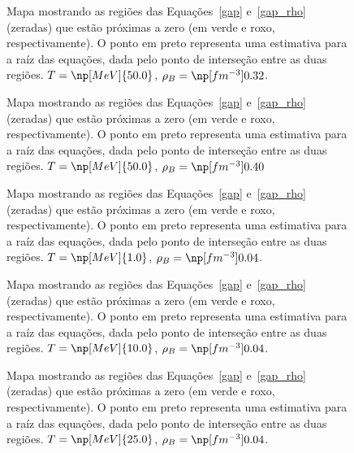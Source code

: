 \begin{figure}
	
	\caption{Mapa mostrando as regiões das Equações~\ref{gap} e~\ref{gap_rho} (zeradas) que estão próximas a zero (em verde e roxo, respectivamente). O ponto em preto representa uma estimativa para a raíz das equações, dada pelo ponto de interseção entre as duas regiões. $T = \np[MeV]{50.0}$, $\rho_B = \np[fm^{-3}]{0.32}$.\protect}
	\label{Fig:Map_9_7}
\end{figure}

\begin{figure}
	
	\caption{Mapa mostrando as regiões das Equações~\ref{gap} e~\ref{gap_rho} (zeradas) que estão próximas a zero (em verde e roxo, respectivamente). O ponto em preto representa uma estimativa para a raíz das equações, dada pelo ponto de interseção entre as duas regiões. $T = \np[MeV]{50.0}$, $\rho_B = \np[fm^{-3}]{0.40}$\protect}
	\label{Fig:Map_9_8}
\end{figure}

\FloatBarrier

\begin{figure}
	
	\caption{Mapa mostrando as regiões das Equações~\ref{gap} e~\ref{gap_rho} (zeradas) que estão próximas a zero (em verde e roxo, respectivamente). O ponto em preto representa uma estimativa para a raíz das equações, dada pelo ponto de interseção entre as duas regiões. $T = \np[MeV]{1.0}$, $\rho_B = \np[fm^{-3}]{0.04}$.\protect}
	\label{Fig:Map_0_0}
\end{figure}

\begin{figure}
	
	\caption{Mapa mostrando as regiões das Equações~\ref{gap} e~\ref{gap_rho} (zeradas) que estão próximas a zero (em verde e roxo, respectivamente). O ponto em preto representa uma estimativa para a raíz das equações, dada pelo ponto de interseção entre as duas regiões.  $T = \np[MeV]{10.0}$, $\rho_B = \np[fm^{-3}]{0.04}$.\protect}
	\label{Fig:Map_3_0}
\end{figure}

\begin{figure}
	
	\caption{Mapa mostrando as regiões das Equações~\ref{gap} e~\ref{gap_rho} (zeradas) que estão próximas a zero (em verde e roxo, respectivamente). O ponto em preto representa uma estimativa para a raíz das equações, dada pelo ponto de interseção entre as duas regiões. $T = \np[MeV]{25.0}$, $\rho_B = \np[fm^{-3}]{0.04}$. \protect}
	\label{Fig:Map_6_0}
\end{figure}

